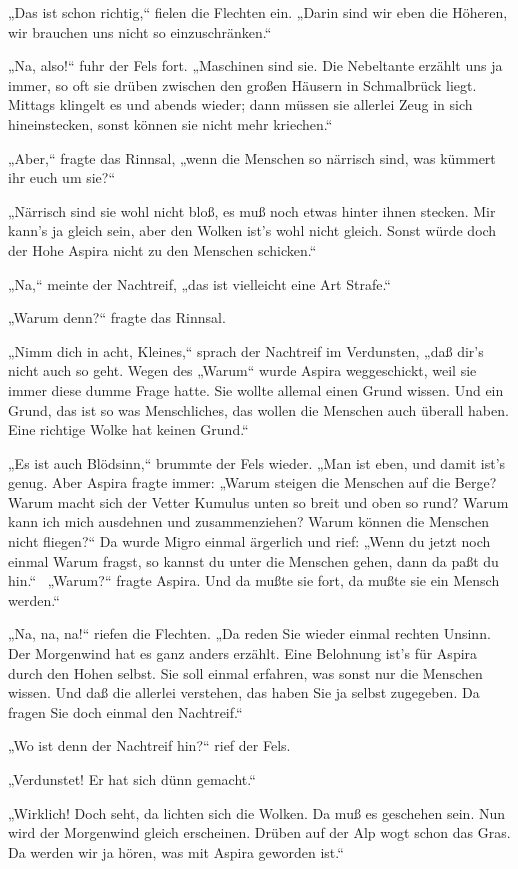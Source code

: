„Das ist schon richtig,“ fielen die Flechten ein. „Darin sind wir
eben die Höheren, wir brauchen uns nicht so einzuschränken.“

„Na, also!“ fuhr der Fels fort. „Maschinen sind sie. Die Nebeltante
erzählt uns ja immer, so oft sie drüben zwischen den großen Häusern
in Schmalbrück liegt. Mittags klingelt es und abends wieder; dann
müssen sie allerlei Zeug in sich hineinstecken, sonst können sie
nicht mehr kriechen.“

„Aber,“ fragte das Rinnsal, „wenn die Menschen so närrisch sind,
was kümmert ihr euch um sie?“

„Närrisch sind sie wohl nicht bloß, es muß noch etwas hinter ihnen
stecken. Mir kann's ja gleich sein, aber den Wolken ist's wohl
nicht gleich. Sonst würde doch der Hohe Aspira nicht zu den
Menschen schicken.“

„Na,“ meinte der Nachtreif, „das ist vielleicht eine Art Strafe.“

„Warum denn?“ fragte das Rinnsal.

„Nimm dich in acht, Kleines,“ sprach der Nachtreif im Verdunsten,
„daß dir's nicht auch so geht. Wegen des „Warum“ wurde Aspira
weggeschickt, weil sie immer diese dumme Frage hatte. Sie wollte
allemal einen Grund wissen. Und ein Grund, das ist so was
Menschliches, das wollen die Menschen auch überall haben. Eine
richtige Wolke hat keinen Grund.“

„Es ist auch Blödsinn,“ brummte der Fels wieder. „Man ist eben, und
damit ist's genug. Aber Aspira fragte immer: „Warum steigen die
Menschen auf die Berge? Warum macht sich der Vetter Kumulus unten
so breit und oben so rund? Warum kann ich mich ausdehnen und
zusammenziehen? Warum können die Menschen nicht fliegen?“ Da wurde
Migro einmal ärgerlich und rief: „Wenn du jetzt noch einmal Warum
fragst, so kannst du unter die Menschen gehen, dann da paßt du
hin.“~ „Warum?“ fragte Aspira. Und da mußte sie fort, da mußte sie
ein Mensch werden.“

„Na, na, na!“ riefen die Flechten. „Da reden Sie wieder einmal
rechten Unsinn. Der Morgenwind hat es ganz anders erzählt. Eine
Belohnung ist's für Aspira durch den Hohen selbst. Sie soll einmal
erfahren, was sonst nur die Menschen wissen. Und daß die allerlei
verstehen, das haben Sie ja selbst zugegeben. Da fragen Sie doch
einmal den Nachtreif.“

„Wo ist denn der Nachtreif hin?“ rief der Fels.

„Verdunstet! Er hat sich dünn gemacht.“

„Wirklich! Doch seht, da lichten sich die Wolken. Da muß es
geschehen sein. Nun wird der Morgenwind gleich erscheinen. Drüben
auf der Alp wogt schon das Gras. Da werden wir ja hören, was mit
Aspira geworden ist.“


